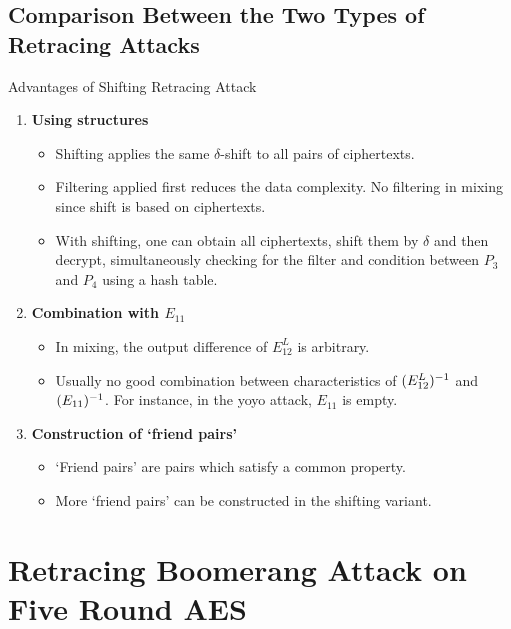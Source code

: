 \documentclass[notheorems]{beamer}
\theoremstyle{definition}
\theoremstyle{example}
\begin{document}
    \subsection{Comparison Between the Two Types of Retracing Attacks}
    \label{subsec:cmp}
    \begin{frame}[<+->]{Advantages of Shifting Retracing Attack}
        \begin{enumerate}
            \item \textbf{Using structures}
            \begin{itemize}[<+->]
                \item Shifting applies the same \(\delta\)-shift to all pairs of
                ciphertexts.
                \item Filtering applied first reduces the data complexity. No
                filtering in mixing since shift is based on ciphertexts.
                \item With shifting, one can obtain all ciphertexts, shift them
                by \(\delta\) and then decrypt, simultaneously checking for the
                filter and condition between \(P_3\) and \(P_4\) using a hash
                table.
            \end{itemize}
            \item \textbf{Combination with \(E_{11}\)}
            \begin{itemize}[<+->]
                \item In mixing, the output difference of \(E_{12}^L\) is
                arbitrary.
                \item Usually no good combination between characteristics of
                \((E_{12}^L)^{-1}\) and \((E_{11})^{-1}\). For
                instance, in the yoyo attack, \(E_{11}\) is empty.
            \end{itemize}
            \item \textbf{Construction of `friend pairs'}
            \begin{itemize}[<+->]
                \item `Friend pairs' are pairs which satisfy a common property.
                \item More `friend pairs' can be constructed in the shifting
                variant.
            \end{itemize}
        \end{enumerate}
    \end{frame}

    \section[Application to AES]{Retracing Boomerang Attack on Five Round AES}
    \label{sec:retr-boomerang-aes}
\end{document}
